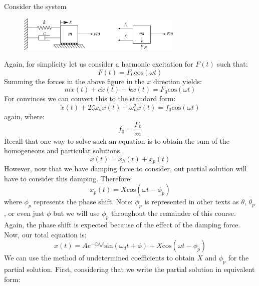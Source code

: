\documentclass[12pt,letter]{article}
\numberwithin{ex}{section} %
\begin{document}
			Consider the system
			\begin{figure}[H]
				\centering
				\includegraphics[width=0.7\textwidth]{../Figures/system_and_FBD_1DOF_damped_forced_horiziontal.png}
			\end{figure}	
			Again, for simplicity let us consider a harmonic excitation for $F(t)$ such that:
			\begin{equation}
				F(t) = F_0\text{cos}(\omega t)
			\end{equation}							
			Summing the forces in the above figure in the $x$ direction yields:
			\begin{equation}
				m \ddot{x}(t)+c\dot{x}(t)+kx(t) = F_0\text{cos}(\omega t)
			\end{equation}			
			For convinces we can convert this to the standard form:					
			\begin{equation}
				\ddot{x}(t)+2 \zeta \omega_n \dot{x}(t) +\omega_n^2x(t) = f_0\text{cos}(\omega t)
			\end{equation}					
			again, where:
			\begin{equation}
				f_0 = \frac{F_0}{m}
			\end{equation}	
			Recall that one way to solve such an equation is to obtain the sum of the homogeneous and particular solutions. 
			\begin{equation}
				x(t) = x_h(t) + x_p(t)
			\end{equation}	
			However, now that we have damping force to consider, out partial solution will have to consider this damping. Therefore:
			\begin{equation}
				x_p(t) = X \text{cos}(\omega t - \phi_p)
			\end{equation}
			where $\phi_p$ represents the phase shift. Note: $\phi_p$ is represented in other texts as $\theta$, $\theta_p$, or even just $\phi$ but we will use $\phi_p$ throughout the remainder of this course. Again, the phase shift is expected because of the effect of the damping force. Now, our total equation is:
			\begin{equation}
				x(t) = Ae^{-\zeta \omega_n t}\text{sin}(\omega_d t + \phi) +  X \text{cos}(\omega t - \phi_p)
			\end{equation}			
			We can use the method of undetermined coefficients to obtain $X$ and $\phi_p$ for the partial solution. First, considering that we write the partial solution in equivalent form:
\end{document}
